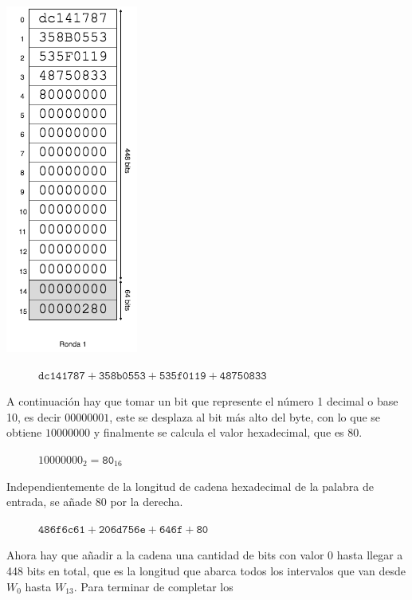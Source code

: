 \documentclass{article}
\begin{document}
        \noindent\begin{minipage}{0.23\textwidth}
        \includegraphics[scale=0.59]{img/Bitcoin_block_SHA_256_W0_W15_ronda_1}
        \end{minipage}
        \hfill
        \begin{minipage}{0.67\textwidth}
        \begin{figure}[H]
        \centering
            $\texttt{dc141787} + \texttt{358b0553} + \texttt{535f0119} + \texttt{48750833}$
        \end{figure}
        A continuación hay que tomar un bit que represente el número 1 decimal o base 10, es decir $00000001$, este se desplaza al bit más alto del byte, con lo que se obtiene $10000000$ y finalmente se calcula el valor hexadecimal, que es $80$.
            \begin{figure}[H]
            \centering
                $10000000_{2} = \texttt{80}_{16}$
            \end{figure}
        Independientemente de la longitud de cadena hexadecimal de la palabra de entrada, se añade $80$ por la derecha.
            \begin{figure}[H]
            \centering
                $\texttt{486f6c61} + \texttt{206d756e} + \texttt{646f} + \texttt{80}$
            \end{figure}
        Ahora hay que añadir a la cadena una cantidad de bits con valor $0$ hasta llegar a 448 bits en total, que es la longitud que abarca todos los intervalos que van desde $W_{0}$ hasta $W_{13}$. Para terminar de completar los
        \end{minipage}
        
\end{document}
